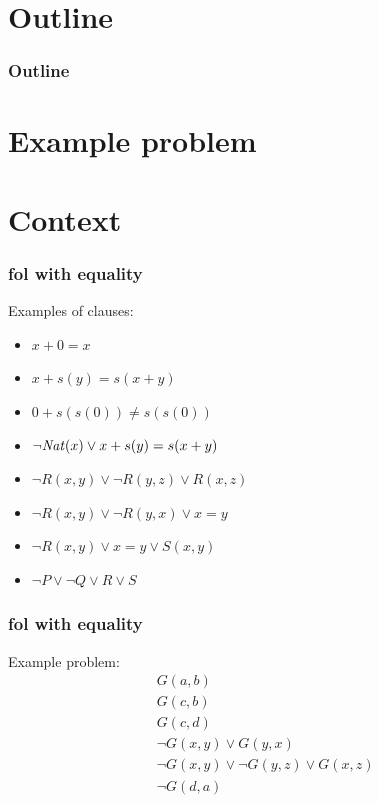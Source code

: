 \documentclass[a4paper]{beamer}
\author[F. Bártek]{Filip Bártek}
\title{\DissertationTitle}
\institute[\FacultyAndUniversityAbbr]{\University}
\date{\DTMdate{2022-03-23}}
\begin{document}
\begin{frame}
\titlepage
\end{frame}

\section*{Outline}
\begin{frame}%
\frametitle{Outline}
\tableofcontents
\end{frame}

\section{Example problem}



\section{Context}

\begin{frame}
\frametitle{\Gls{fol} with equality}
Examples of clauses:
\begin{itemize}
\item $x + 0 = x$
\item $x + s(y) = s(x + y)$
\item $0 + s(s(0)) \neq s(s(0))$
\item $\lnot \mathit{Nat}(x) \lor x + s(y) = s(x + y)$
\item $\lnot R(x, y) \lor \lnot R(y, z) \lor R(x, z)$
\item $\lnot R(x, y) \lor \lnot R(y, x) \lor x = y$
\item $\lnot R(x, y) \lor x = y \lor S(x, y)$
\item $\lnot P \lor \lnot Q \lor R \lor S$
\end{itemize}
\end{frame}

\begin{frame}
\frametitle{\Gls{fol} with equality}
Example problem:
\begin{align*}
&G(a, b)\\
&G(c, b)\\
&G(c, d)\\
&\lnot G(x, y) \lor G(y, x) \tag{symmetry}\\
&\lnot G(x, y) \lor \lnot G(y, z) \lor G(x, z) \tag{transitivity}\\
&\lnot G(d, a) \tag{negated conjecture}
\end{align*}
\end{frame}
\end{document}
